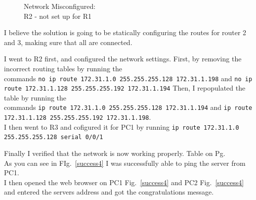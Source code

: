 \documentclass[../EngineeringJournal_CDavis.tex]{subfiles}
\begin{document}
\begin{figure}[!hbt]\centering
{}\par
\caption{Network Misconfigured: \\R2 - not set up for R1}
\label{misconfig4}
\end{figure}




I believe the solution is going to be statically configuring the routes for router 2 and 3, making sure that all are connected.


I went to R2 first, and configured the network settings. First, by removing the
incorrect routing tables by running the 
\\commands {\scriptsize{\verb$no ip route 172.31.1.0 255.255.255.128 172.31.1.198$}\normalsize} and {\scriptsize{\verb$no ip route 172.31.1.128 255.255.255.192 172.31.1.194$}\normalsize}  Then, I repopulated the table by running the 
\\commands {\scriptsize{\verb$ip route 172.31.1.0 255.255.255.128 172.31.1.194$}\normalsize} and {\scriptsize{\verb$ip route 172.31.1.128 255.255.255.192 172.31.1.198$}\normalsize}. 
\\I then went to R3 and cofigured it for PC1 by running {\scriptsize{\verb$ip route 172.31.1.0 255.255.255.128 serial 0/0/1$}\normalsize} 


Finally I verified that the network is now working properly. Table on
Pg.~\pageref{success4}
\\As you can see in FIg.~\ref{success4} I was successfully able to ping the server from PC1. 
\\I then opened the web browser on PC1 Fig.~\ref{success4} and PC2
Fig.~\ref{success4} and entered the servers
address and got the congratulations message.
\end{document}
